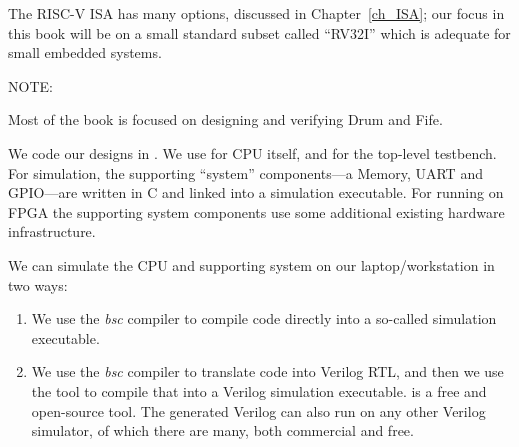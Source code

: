 The RISC-V ISA has many options, discussed in Chapter~\ref{ch_ISA};
our focus in this book will be on a small standard subset called
``RV32I'' which is adequate for small embedded systems.


\vspace{1ex}

NOTE: 

\vspace{1ex}


Most of the book is focused on designing and verifying Drum and Fife.

We code our designs in {\BSV}.  We use {\BSV} for CPU itself, and for
the top-level testbench.  For simulation, the supporting ``system''
components---a Memory, UART and GPIO---are written in C and linked
into a simulation executable.  For running on FPGA the supporting
system components use some additional existing hardware
infrastructure.

We can simulate the CPU and supporting system on our
laptop/workstation in two ways:

\begin{enumerate}

 \item We use the \emph{bsc} compiler to compile {\BSV} code directly
       into a so-called {\Bluesim} simulation executable.

 \item We use the \emph{bsc} compiler to translate {\BSV} code into
       Verilog RTL, and then we use the {\Verilator} tool to compile
       that into a Verilog simulation executable. {\Verilator} is a
       free and open-source tool.  The generated Verilog can also run
       on any other Verilog simulator, of which there are many, both
       commercial and free.

\end{enumerate}

